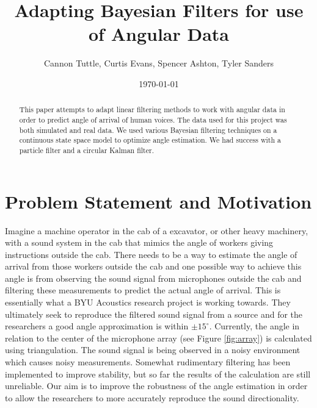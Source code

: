 \documentclass[11pt]{amsart}
\begin{document}
\title{Adapting Bayesian Filters for use of Angular Data}
\author{Cannon Tuttle, Curtis Evans, Spencer Ashton, Tyler Sanders}

\date{\today}

\begin{abstract}
    This paper attempts to adapt linear filtering methods to work with angular data in order to predict angle of arrival of human voices. The data used for this 
    project was both simulated and real data. We used various Bayesian filtering techniques on a continuous state space model to optimize angle estimation. We had
    success with a particle filter and a circular Kalman filter.
\end{abstract}

\maketitle

\section{Problem Statement and Motivation}
Imagine a machine operator in the cab of a excavator, or other heavy machinery, with a sound system in the cab that mimics the angle of workers giving instructions
outside the cab. There needs to be a way to estimate the angle of arrival from those workers outside the cab and one possible way to achieve this angle is from observing
the sound signal from microphones outside the cab and filtering these measurements to predict the actual angle of arrival. This is essentially what a BYU Acoustics research project is 
working towards. They ultimately seek to reproduce the filtered sound signal from a source and for the researchers a good angle approximation is within $\pm15^{\circ}$. Currently, the angle in relation to the center of the microphone array (see Figure \ref{fig:array}) 
is calculated using triangulation. The sound signal is being observed in a noisy environment which causes noisy measurements. Somewhat rudimentary filtering has been implemented to improve stability, 
but so far the results of the calculation are still unreliable. Our aim is to improve the robustness of the angle estimation in order to allow the researchers to more accurately reproduce the sound directionality.
\end{document}
